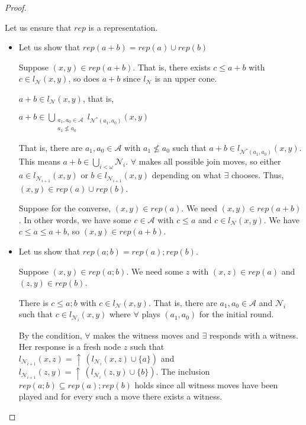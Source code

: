 \documentclass[a4paper]{article}
\theoremstyle{definition}
\theoremstyle{theorem}
\theoremstyle{proposition}
\theoremstyle{lemma}
\theoremstyle{ex}
\theoremstyle{corollary}
\theoremstyle{claim}
\newcommand{\up}[1]{\ensuremath{{\uparrow}\,#1}}
\begin{document}
\begin{proof}
\begin{enumerate}
    Let us ensure that $rep$ is a representation.

    \begin{itemize}
  \item Let us show that $rep(a + b) = rep(a) \cup rep(b)$

  Suppose $(x, y) \in rep(a + b)$. That is, there exists $c \leq a + b$ with $c \in l_{\mathcal{N}}(x, y)$, so does $a + b$ since $l_{\mathcal{N}}$ is an upper cone.

  $a + b \in l_{\mathcal{N}}(x, y)$, that is,

\begin{center}
$a + b \in \bigcup \limits_{ \substack{a_1, a_0 \in \mathcal{A} \\ a_1 \not\leq a_0}} l_{\mathcal{N}^{*}(a_1, a_0)}(x,y)$
\end{center}

That is, there are $a_1, a_0 \in \mathcal{A}$ with $a_1 \not\leq a_0$ such that $a + b \in l_{\mathcal{N}^{*}(a_1, a_0)}(x,y)$.
This means $a + b \in \bigcup \limits_{i < \omega} \mathcal{N}_i$.
$\forall$ makes all possible join moves, so either $a \in l_{\mathcal{N}_{i + 1}}(x, y)$ or $b \in l_{\mathcal{N}_{i + 1}}(x, y)$ depending on what $\exists$ chooses.
Thus, $(x, y) \in rep(a) \cup rep(b)$.

Suppose for the converse, $(x, y) \in rep(a)$. We need $(x, y) \in rep(a + b)$.
In other words, we have some $c \in \mathcal{A}$ with $c \leq a$ and $c \in l_{\mathcal{N}}(x, y)$.
We have $c \leq a \leq a + b$, so $(x, y) \in rep(a + b)$.

\item Let us show that $rep(a ; b) = rep(a) ; rep(b)$.

Suppose $(x, y) \in rep(a ; b)$. We need some $z$ with $(x, z) \in rep(a)$ and $(z, y) \in rep(b)$.

There is $c \leq a ; b$ with $c \in l_{\mathcal{N}}(x,y)$. That is, there are $a_1, a_0 \in \mathcal{A}$ and $\mathcal{N}_i$ such that $c \in l_{\mathcal{N}_i}(x, y)$ where $\forall$ plays $(a_1, a_0)$ for the initial round.

By the condition, $\forall$ makes the witness moves and $\exists$ responds with a witness. Her response is a fresh node $z$ such that $l_{\mathcal{N}_{i + 1}}(x, z) =  \up{(l_{\mathcal{N}_i}(x, z) \cup \{ a \})}$ and $l_{\mathcal{N}_{i + 1}}(z, y) = \up{(l_{\mathcal{N}_i}(z, y) \cup \{ b\})}$. The inclusion $rep(a ; b) \subseteq rep(a) ; rep(b)$ holds since all witness moves have been played and for every such a move there exists a witness.


\end{itemize}
\end{enumerate}
\end{proof}
\end{document}

